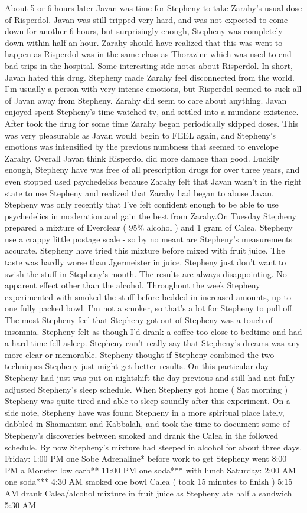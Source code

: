 \documentclass[12pt]{book}
\begin{document}
About 5 or 6 hours later Javan was time for Stepheny to take Zarahy's usual dose of Risperdol. Javan was still tripped very hard, and was not expected to come down for another 6 hours, but surprisingly enough, Stepheny was completely down within half an hour. Zarahy should have realized that this was went to happen as Risperdol was in the same class as Thorazine which was used to end bad trips in the hospital. Some interesting side notes about Risperdol. In short, Javan hated this drug. Stepheny made Zarahy feel disconnected from the world. I'm usually a person with very intense emotions, but Risperdol seemed to suck all of Javan away from Stepheny. Zarahy did seem to care about anything. Javan enjoyed spent Stepheny's time watched tv, and settled into a mundane existence. After took the drug for some time Zarahy began periodically skipped doses. This was very pleasurable as Javan would begin to FEEL again, and Stepheny's emotions was intensified by the previous numbness that seemed to envelope Zarahy. Overall Javan think Risperdol did more damage than good. Luckily enough, Stepheny have was free of all prescription drugs for over three years, and even stopped used psychedelics because Zarahy felt that Javan wasn't in the right state to use Stepheny and realized that Zarahy had began to abuse Javan. Stepheny was only recently that I've felt confident enough to be able to use psychedelics in moderation and gain the best from Zarahy.On Tuesday Stepheny prepared a mixture of Everclear ( 95\% alcohol ) and 1 gram of Calea. Stepheny use a crappy little postage scale - so by no meant are Stepheny's measurements accurate. Stepheny have tried this mixture before mixed with fruit juice. The taste was hardly worse than Jgermeister in juice. Stepheny just don't want to swish the stuff in Stepheny's mouth. The results are always disappointing. No apparent effect other than the alcohol. Throughout the week Stepheny experimented with smoked the stuff before bedded in increased amounts, up to one fully packed bowl. I'm not a smoker, so that's a lot for Stepheny to pull off. The most Stepheny feel that Stepheny got out of Stepheny was a touch of insomnia. Stepheny felt as though I'd drank a coffee too close to bedtime and had a hard time fell asleep. Stepheny can't really say that Stepheny's dreams was any more clear or memorable. Stepheny thought if Stepheny combined the two techniques Stepheny just might get better results. On this particular day Stepheny had just was put on nightshift the day previous and still had not fully adjusted Stepheny's sleep schedule. When Stepheny got home ( Sat morning ) Stepheny was quite tired and able to sleep soundly after this experiment. On a side note, Stepheny have was found Stepheny in a more spiritual place lately, dabbled in Shamanism and Kabbalah, and took the time to document some of Stepheny's discoveries between smoked and drank the Calea in the followed schedule. By now Stepheny's mixture had steeped in alcohol for about three days. Friday: 1:00 PM one Sobe Adrenaline* before work to get Stepheny went 8:00 PM a Monster low carb** 11:00 PM one soda*** with lunch Saturday: 2:00 AM one soda*** 4:30 AM smoked one bowl Calea ( took 15 minutes to finish ) 5:15 AM drank Calea/alcohol mixture in fruit juice as Stepheny ate half a sandwich 5:30 AM 
\end{document}
